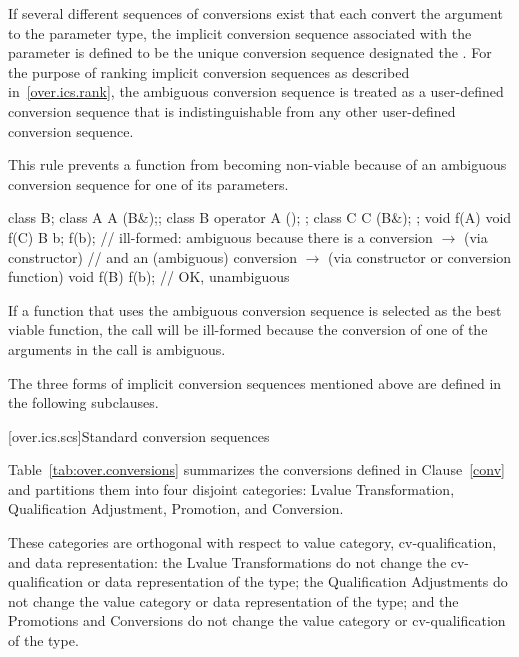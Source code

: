 \pnum
If several different sequences of conversions exist that each
convert the argument to the parameter type, the implicit
conversion sequence associated with the parameter is defined to be
the unique conversion sequence designated the
.
%
For the purpose of ranking implicit conversion sequences as described
in~\ref{over.ics.rank}, the ambiguous conversion sequence is treated
as a user-defined conversion sequence that is indistinguishable from any
other user-defined conversion sequence.
\begin{note}
This rule prevents a function from becoming non-viable because of an ambiguous
conversion sequence for one of its parameters.
\begin{example}
\begin{codeblock}
class B;
class A { A (B&);};
class B { operator A (); };
class C { C (B&); };
void f(A) { }
void f(C) { }
B b;
f(b);               // ill-formed: ambiguous because there is a conversion  $\to$  (via constructor)
                    // and an (ambiguous) conversion  $\to$  (via constructor or conversion function)
void f(B) { }
f(b);               // OK, unambiguous
\end{codeblock}
\end{example}
\end{note}
If a function that uses the ambiguous conversion sequence is selected
as the best viable function, the call will be ill-formed because the conversion
of one of the arguments in the call is ambiguous.

\pnum
The three forms of implicit conversion sequences mentioned above
are defined in the following subclauses.

[over.ics.scs]{Standard conversion sequences}

\pnum
Table~\ref{tab:over.conversions}
summarizes the conversions defined in Clause~\ref{conv} and
partitions them into four disjoint categories: Lvalue Transformation,
Qualification Adjustment, Promotion, and Conversion.
\begin{note}
These categories are orthogonal with respect to value category,
cv-qualification, and data representation: the Lvalue Transformations
do not change the cv-qualification or data
representation of the type; the Qualification Adjustments do not
change the value category or data representation of the type; and
the Promotions and Conversions do not change the
value category or cv-qualification of the type.
\end{note}

